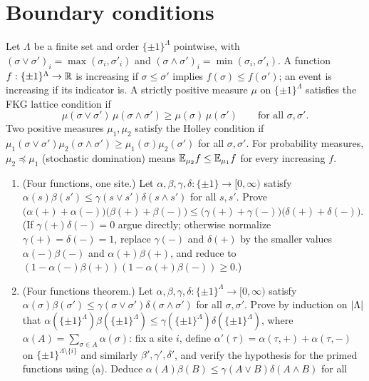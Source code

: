 \section{Boundary conditions}

\begin{exercise}
Let $\Lambda$ be a finite set and order $\{\pm1\}^\Lambda$ pointwise, with
$(\sigma\vee\sigma')_i=\max(\sigma_i,\sigma'_i)$ and
$(\sigma\wedge\sigma')_i=\min(\sigma_i,\sigma'_i)$.  A function
$f:\{\pm1\}^\Lambda\to\mathbb R$ is increasing if $\sigma\le\sigma'$ implies
$f(\sigma)\le f(\sigma')$; an event is increasing if its indicator is.  A
strictly positive measure $\mu$ on $\{\pm1\}^\Lambda$ satisfies the FKG
lattice condition if
\[
 \mu(\sigma\vee\sigma')\,\mu(\sigma\wedge\sigma')\ge\mu(\sigma)\,\mu(\sigma')
 \qquad\text{for all }\sigma,\sigma' .
\]
Two positive measures $\mu_1,\mu_2$ satisfy the Holley condition if
$\mu_1(\sigma\vee\sigma')\mu_2(\sigma\wedge\sigma')\ge\mu_1(\sigma)\mu_2(\sigma')$
for all $\sigma,\sigma'$.  For probability measures, $\mu_2\preceq\mu_1$
(stochastic domination) means $\mathbb E_{\mu_2}f\le\mathbb E_{\mu_1}f$ for every increasing $f$.
\begin{enumerate}[label=(\alph*)]
\item (Four functions, one site.)  Let $\alpha,\beta,\gamma,\delta:\{\pm1\}\to[0,\infty)$
satisfy $\alpha(s)\beta(s')\le\gamma(s\vee s')\delta(s\wedge s')$ for all
$s,s'$.  Prove
$\bigl(\alpha(+)+\alpha(-)\bigr)\bigl(\beta(+)+\beta(-)\bigr)\le\bigl(\gamma(+)+\gamma(-)\bigr)\bigl(\delta(+)+\delta(-)\bigr)$.
(If $\gamma(+)\delta(-)=0$ argue directly; otherwise normalize
$\gamma(+)=\delta(-)=1$, replace $\gamma(-)$ and $\delta(+)$ by the smaller
values $\alpha(-)\beta(-)$ and $\alpha(+)\beta(+)$, and reduce to
$(1-\alpha(-)\beta(+))(1-\alpha(+)\beta(-))\ge0$.)
\item (Four functions theorem.)  Let $\alpha,\beta,\gamma,\delta:\{\pm1\}^\Lambda\to[0,\infty)$
satisfy $\alpha(\sigma)\beta(\sigma')\le\gamma(\sigma\vee\sigma')\delta(\sigma\wedge\sigma')$
for all $\sigma,\sigma'$.  Prove by induction on $\left\lvert \Lambda\right\rvert$ that
$\alpha(\{\pm1\}^\Lambda)\beta(\{\pm1\}^\Lambda)\le\gamma(\{\pm1\}^\Lambda)\delta(\{\pm1\}^\Lambda)$,
where $\alpha(A)=\sum_{\sigma\in A}\alpha(\sigma)$: fix a site $i$, define
$\alpha'(\tau)=\alpha(\tau,+)+\alpha(\tau,-)$ on $\{\pm1\}^{\Lambda\setminus\{i\}}$
and similarly $\beta',\gamma',\delta'$, and verify the hypothesis for the
primed functions using (a).  Deduce
$\alpha(A)\beta(B)\le\gamma(A\vee B)\delta(A\wedge B)$ for all

\end{enumerate}
\end{exercise}
